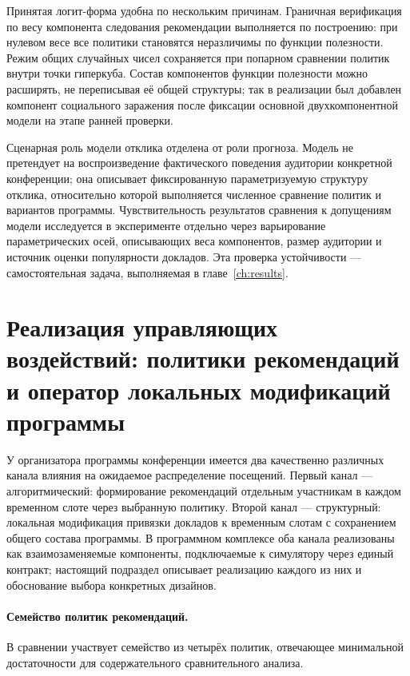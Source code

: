 Принятая логит-форма удобна по нескольким причинам. Граничная верификация по весу компонента следования рекомендации выполняется по построению: при нулевом весе все политики становятся неразличимы по функции полезности. Режим общих случайных чисел сохраняется при попарном сравнении политик внутри точки гиперкуба. Состав компонентов функции полезности можно расширять, не переписывая её общей структуры; так в реализации был добавлен компонент социального заражения после фиксации основной двухкомпонентной модели на этапе ранней проверки.

Сценарная роль модели отклика отделена от роли прогноза. Модель не претендует на воспроизведение фактического поведения аудитории конкретной конференции; она описывает фиксированную параметризуемую структуру отклика, относительно которой выполняется численное сравнение политик и вариантов программы. Чувствительность результатов сравнения к допущениям модели исследуется в эксперименте отдельно через варьирование параметрических осей, описывающих веса компонентов, размер аудитории и источник оценки популярности докладов. Эта проверка устойчивости --- самостоятельная задача, выполняемая в главе~\ref{ch:results}.


\section{Реализация управляющих воздействий: политики рекомендаций и оператор локальных модификаций программы}
\label{sec:3-4}

У организатора программы конференции имеется два качественно различных канала влияния на ожидаемое распределение посещений. Первый канал --- алгоритмический: формирование рекомендаций отдельным участникам в каждом временном слоте через выбранную политику. Второй канал --- структурный: локальная модификация привязки докладов к временным слотам с сохранением общего состава программы. В программном комплексе оба канала реализованы как взаимозаменяемые компоненты, подключаемые к симулятору через единый контракт; настоящий подраздел описывает реализацию каждого из них и обоснование выбора конкретных дизайнов.

\paragraph{Семейство политик рекомендаций.}
В сравнении участвует семейство из четырёх политик, отвечающее минимальной достаточности для содержательного сравнительного анализа.


